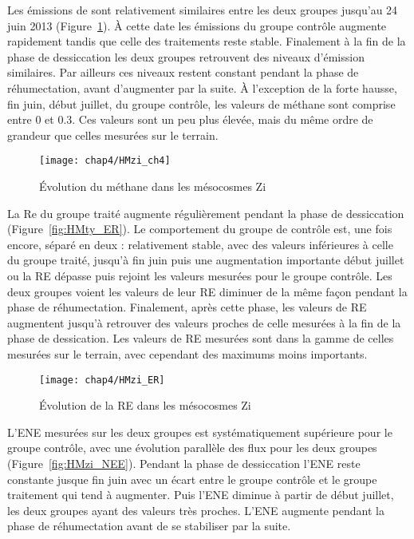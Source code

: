 Les émissions de \chh sont relativement similaires entre les deux groupes jusqu'au 24 juin 2013 (Figure~\ref{fig:HMzi_ch4}).
À cette date les émissions du groupe contrôle augmente rapidement tandis que celle des traitements reste stable.
Finalement à la fin de la phase de dessiccation les deux groupes retrouvent des niveaux d'émission similaires.
Par ailleurs ces niveaux restent constant pendant la phase de réhumectation, avant d'augmenter par la suite.
À l'exception de la forte hausse, fin juin, début juillet, du groupe contrôle, les valeurs de méthane sont comprise entre 0 et \SI{0.3}{\uml}.
Ces valeurs sont un peu plus élevée, mais du même ordre de grandeur que celles mesurées sur le terrain.

\begin{figure}
\centering
\texttt{[image: chap4/HMzi\_ch4]}
\caption{Évolution du méthane dans les mésocosmes Zi}
\label{fig:HMzi_ch4}
\end{figure}

La Re du groupe traité augmente régulièrement pendant la phase de dessiccation (Figure~\ref{fig:HMty_ER}).
Le comportement du groupe de contrôle est, une fois encore, séparé en deux : relativement stable, avec des valeurs inférieures à celle du groupe traité, jusqu'à fin juin puis une augmentation importante début juillet ou la RE dépasse puis rejoint les valeurs mesurées pour le groupe contrôle.
Les deux groupes voient les valeurs de leur RE diminuer de la même façon pendant la phase de réhumectation.
Finalement, après cette phase, les valeurs de RE augmentent jusqu'à retrouver des valeurs proches de celle mesurées à la fin de la phase de dessication.
Les valeurs de RE mesurées sont dans la gamme de celles mesurées sur le terrain, avec cependant des maximums moins importants.

\begin{figure}
\centering
\texttt{[image: chap4/HMzi\_ER]}
\caption{Évolution de la RE dans les mésocosmes Zi}
\label{fig:HMzi_ER}
\end{figure}

L'ENE mesurées sur les deux groupes est systématiquement supérieure pour le groupe contrôle, avec une évolution parallèle des flux pour les deux groupes (Figure~\ref{fig:HMzi_NEE}).
Pendant la phase de dessiccation l'ENE reste constante jusque fin juin avec un écart entre le groupe contrôle et le groupe traitement qui tend à augmenter.
Puis l'ENE diminue à partir de début juillet, les deux groupes ayant des valeurs très proches.
L'ENE augmente pendant la phase de réhumectation avant de se stabiliser par la suite.

